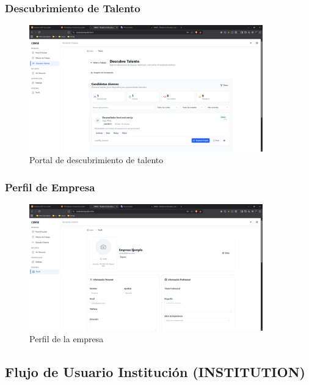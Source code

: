\documentclass[12pt,a4paper]{article}
\begin{document}
\begin{enumerate}
\subsubsection{Descubrimiento de Talento}
\begin{figure}[H]
    \centering
    \includegraphics[width=0.9\textwidth]{screenshots/companies/talent-discovery.png}
    \caption{Portal de descubrimiento de talento}
    \label{fig:company-talent}
\end{figure}

\subsubsection{Perfil de Empresa}
\begin{figure}[H]
    \centering
    \includegraphics[width=0.9\textwidth]{screenshots/companies/profile.png}
    \caption{Perfil de la empresa}
    \label{fig:company-profile}
\end{figure}

\subsection{Flujo de Usuario Institución (INSTITUTION)}


\end{enumerate}
\end{document}
